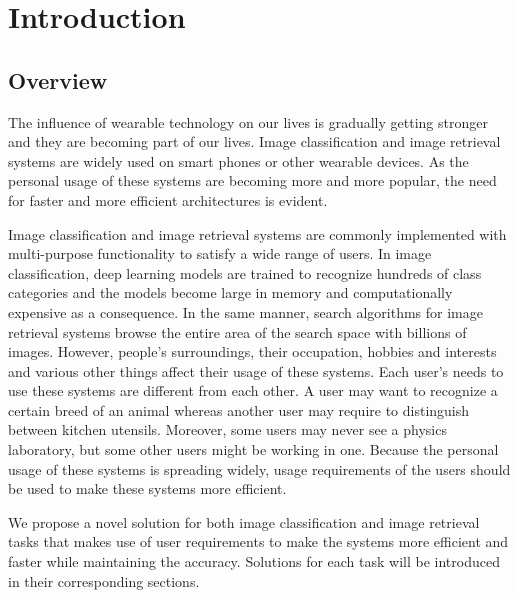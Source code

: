 
\lhead[\chaptername~\thechapter]{\rightmark}

\rhead[\leftmark]{}

\lfoot[\thepage]{}

\cfoot{}

\rfoot[]{\thepage}

\chapter{Introduction}\label{introduction}

\section{Overview}

The influence of wearable technology on our lives is gradually getting stronger and they are becoming part of our lives. 
Image classification and image retrieval systems are widely used on smart phones or other wearable devices.
As the personal usage of these systems are becoming more and more popular, the need for faster and more efficient architectures is evident. 

Image classification and image retrieval systems are commonly implemented with multi-purpose functionality to satisfy a wide range of users. 
In image classification, deep learning models are trained to recognize hundreds of class categories and the models become large in memory and computationally expensive as a consequence.
In the same manner, search algorithms for image retrieval systems browse the entire area of the search space with billions of images.
However, people's surroundings, their occupation, hobbies and interests and various other things affect their usage of these systems.
Each user's needs to use these systems are different from each other.
A user may want to recognize a certain breed of an animal 
whereas another user may require to distinguish between kitchen utensils.
Moreover, some users may never see a physics laboratory, but some other users might be working in one.
Because the personal usage of these systems is spreading widely, 
usage requirements of the users should be used to make these systems more efficient.

We propose a novel solution for both image classification and image retrieval tasks 
that makes use of user requirements to make the systems more efficient and faster while maintaining the accuracy.
Solutions for each task will be introduced in their corresponding sections.



